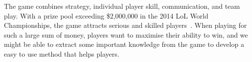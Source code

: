 The game combines strategy, individual player skill, communication, and team play. With a prize pool exceeding \$2,000,000 in the 2014 LoL World Championships, the game attracts serious and skilled players~\cite{lolprize}. When playing for such a large sum of money, players want to maximise their ability to win, and we might be able to extract some important knowledge from the game to develop a easy to use method that helps players.


